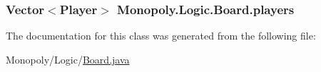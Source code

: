 \subsubsection[{\texorpdfstring{players}{players}}]{\setlength{\rightskip}{0pt plus 5cm}Vector$<${\bf Player}$>$ Monopoly.\+Logic.\+Board.\+players\hspace{0.3cm}{\ttfamily [private]}}\hypertarget{class_monopoly_1_1_logic_1_1_board_ae0af8df9bdefdb9dad582cab0abd1abe}{}\label{class_monopoly_1_1_logic_1_1_board_ae0af8df9bdefdb9dad582cab0abd1abe}


The documentation for this class was generated from the following file\+:\begin{DoxyCompactItemize}
\item 
Monopoly/\+Logic/\hyperlink{_board_8java}{Board.\+java}\end{DoxyCompactItemize}
